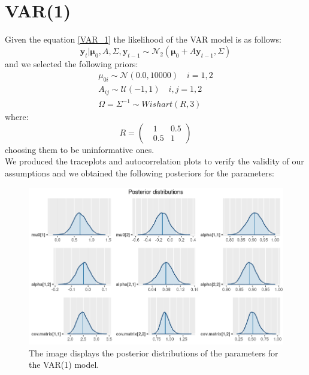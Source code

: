 \section*{VAR(1)}
Given the equation \ref{VAR_1} the likelihood of the VAR model is as follows:
\begin{equation}
    \mathbf{y}_{t}|\mathbf{\mu}_{0}, A, \Sigma, \mathbf{y}_{t-1} \sim \mathcal{N}_2(\mathbf{\mu}_{0} + A \mathbf{y}_{t-1}, \Sigma)
\end{equation}
and we selected the following priors:
\begin{equation}
    \begin{split}
        \mu_{0i} \sim \mathcal{N}(0.0, 10000) \quad i = 1, 2\\
        A_{ij} \sim \mathcal{U}(-1, 1) \quad i,j = 1, 2 \\
        \Omega = \Sigma^{-1} \sim Wishart(R, 3)
    \end{split}
\end{equation}
where:
\begin{equation}
    R = 
    \begin{pmatrix}
        \ \ \ 1 & 0.5 \\
        \ \ \ 0.5 & 1
    \end{pmatrix}
\end{equation}
choosing them to be uninformative ones. \\
We produced the traceplots and autocorrelation plots to verify the validity of our assumptions and we obtained the following posteriors for the parameters: \\
\begin{figure}[h]
    \centering
    \includegraphics[width=\textwidth]{images/6-VAR/posteriors.png}
    \caption{The image displays the posterior distributions of the parameters for the VAR(1) model.}
    \label{fig:VAR_posteriors}
\end{figure} \\
